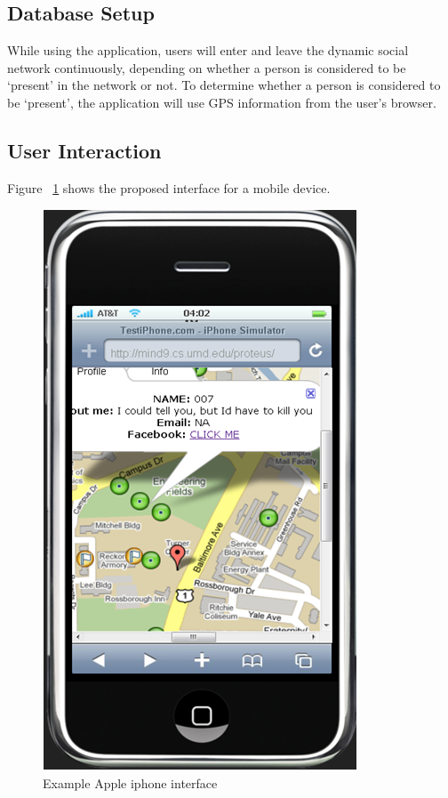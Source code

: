 \documentclass[11pt]{article}
\begin{document}
\subsection{Database Setup}


While using the application, users will enter and leave the dynamic social network continuously, depending on whether a person is considered to be `present' in the network or not. To determine whether a person is considered to be `present', the application will use GPS information from the user's browser. 

\subsection{User Interaction}

Figure ~\ref{fig:phoneapp} shows the proposed interface for a mobile device.
 
\begin{figure}[h]
\begin{center}
  \includegraphics[scale=0.5]{phoneapp.png}
\caption{Example Apple iphone interface}
\label{fig:phoneapp} 
\end{center}
\end{figure}
\end{document}
